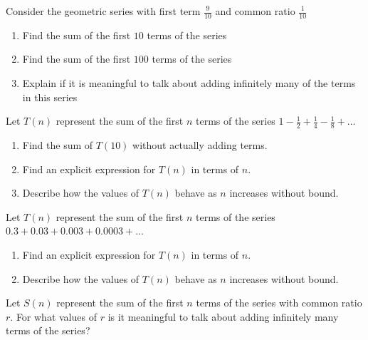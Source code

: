 \documentclass[10pt,]{book}
\theoremstyle{ptxdefinitionnotitle}
\theoremstyle{ptxdefinitiontitle}
\theoremstyle{ptxdefinitionnotitle}
\theoremstyle{ptxdefinitiontitle}
\theoremstyle{ptxdefinitionnotitle}
\theoremstyle{ptxdefinitiontitle}
\numberwithin{equation}{section}
\begin{document}
\begin{divisionexercise}{4}\hypertarget{exercise-35}{}
\hypertarget{p-176}{}%
Consider the geometric series with first term \(\frac{9}{10}\) and common ratio \(\frac{1}{10}\)%
\leavevmode%
\begin{enumerate}[label=(\alph*)]
\item\hypertarget{li-75}{}Find the sum of the first \(10\) terms of the series%
\item\hypertarget{li-76}{}Find the sum of the first \(100\) terms of the series%
\item\hypertarget{li-77}{}Explain if it is meaningful to talk about adding infinitely many of the terms in this series%
\end{enumerate}
\end{divisionexercise}%
\begin{divisionexercise}{5}\hypertarget{exercise-36}{}
\hypertarget{p-177}{}%
Let \(T(n)\) represent the sum of the first \(n\) terms of the series \(1 - \frac{1}{2} + \frac{1}{4} - \frac{1}{8} + ...\)%
\leavevmode%
\begin{enumerate}[label=(\alph*)]
\item\hypertarget{li-78}{}Find the sum of \(T(10)\) without actually adding terms.%
\item\hypertarget{li-79}{}Find an explicit expression for \(T(n)\) in terms of \(n\).%
\item\hypertarget{li-80}{}Describe how the values of \(T(n)\) behave as \(n\) increases without bound.%
\end{enumerate}
\end{divisionexercise}%
\begin{divisionexercise}{6}\hypertarget{exercise-37}{}
\hypertarget{p-178}{}%
Let \(T(n)\) represent the sum of the first \(n\) terms of the series \(0.3 + 0.03 + 0.003 + 0.0003 + ...\)%
\leavevmode%
\begin{enumerate}[label=(\alph*)]
\item\hypertarget{li-81}{}Find an explicit expression for \(T(n)\) in terms of \(n\).%
\item\hypertarget{li-82}{}Describe how the values of \(T(n)\) behave as \(n\) increases without bound.%
\end{enumerate}
\end{divisionexercise}%
\begin{divisionexercise}{7}\hypertarget{exercise-38}{}
\hypertarget{p-179}{}%
Let \(S(n)\) represent the sum of the first \(n\) terms of the series with common ratio \(r\). For what values of \(r\) is it meaningful to talk about adding infinitely many terms of the series?%
\end{divisionexercise}%
\end{document}
